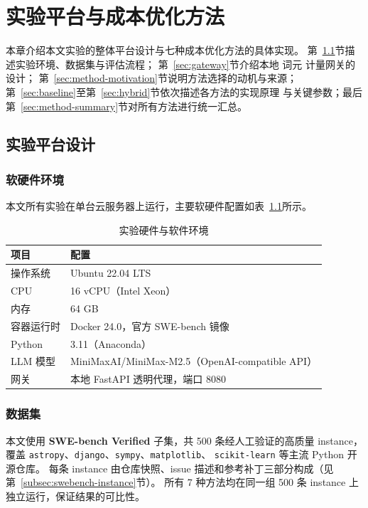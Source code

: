 \chapter{实验平台与成本优化方法}
\label{chap:methods}

本章介绍本文实验的整体平台设计与七种成本优化方法的具体实现。
第~\ref{sec:platform}节描述实验环境、数据集与评估流程；
第~\ref{sec:gateway}节介绍本地 词元 计量网关的设计；
第~\ref{sec:method-motivation}节说明方法选择的动机与来源；
第~\ref{sec:baseline}至第~\ref{sec:hybrid}节依次描述各方法的实现原理
与关键参数；最后第~\ref{sec:method-summary}节对所有方法进行统一汇总。

\section{实验平台设计}
\label{sec:platform}

\subsection{软硬件环境}
\label{subsec:hw-env}

本文所有实验在单台云服务器上运行，主要软硬件配置如表~\ref{tab:hw-env}所示。

\begin{table}[htbp]
\centering
\caption{实验硬件与软件环境}
\label{tab:hw-env}
\begin{tabular}{ll}
\toprule
项目 & 配置 \\
\midrule
操作系统 & Ubuntu 22.04 LTS \\
CPU & 16 vCPU（Intel Xeon） \\
内存 & 64 GB \\
容器运行时 & Docker 24.0，官方 SWE-bench 镜像 \\
Python & 3.11（Anaconda） \\
LLM 模型 & MiniMaxAI/MiniMax-M2.5（OpenAI-compatible API） \\
网关 & 本地 FastAPI 透明代理，端口 8080 \\
\bottomrule
\end{tabular}
\end{table}

\subsection{数据集}
\label{subsec:dataset}

本文使用 \textbf{SWE-bench Verified} 子集，共 500 条经人工验证的高质量 instance，
覆盖 \texttt{astropy}、\texttt{django}、\texttt{sympy}、\texttt{matplotlib}、
\texttt{scikit-learn} 等主流 Python 开源仓库。
每条 instance 由仓库快照、issue 描述和参考补丁三部分构成（见第~\ref{subsec:swebench-instance}节）。
所有 7 种方法均在同一组 500 条 instance 上独立运行，保证结果的可比性。

